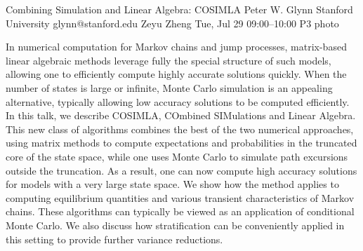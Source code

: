 \clearpage
\begin{talk}
  {Combining Simulation and Linear Algebra: COSIMLA}%
  {Peter W. Glynn}%
  {Stanford University}%
  {glynn@stanford.edu}%
  {Zeyu Zheng}%
  {}%
  {Tue, Jul 29 09:00–10:00}%
  {P3}%
  {photo}%
  
				
			
In numerical computation for Markov chains and jump processes, matrix-based linear algebraic methods leverage fully the special structure of such models, allowing one to efficiently compute highly accurate solutions quickly. When the number of states is large or infinite, Monte Carlo simulation is an appealing alternative, typically allowing low accuracy solutions to be computed efficiently. In this talk, we describe COSIMLA, COmbined SIMulations and Linear Algebra. This new class of algorithms combines the best of the two numerical approaches, using matrix methods to compute expectations and probabilities in the truncated core of the state space, while one uses Monte Carlo to simulate path excursions outside the truncation. As a result, one can now compute high accuracy solutions for models with a very large state space. We show how the method applies to computing equilibrium quantities and various transient characteristics of Markov chains. These algorithms can typically be viewed as an application of conditional Monte Carlo. We also discuss how stratification can be conveniently applied in this setting to provide further variance reductions.  

\end{talk}


